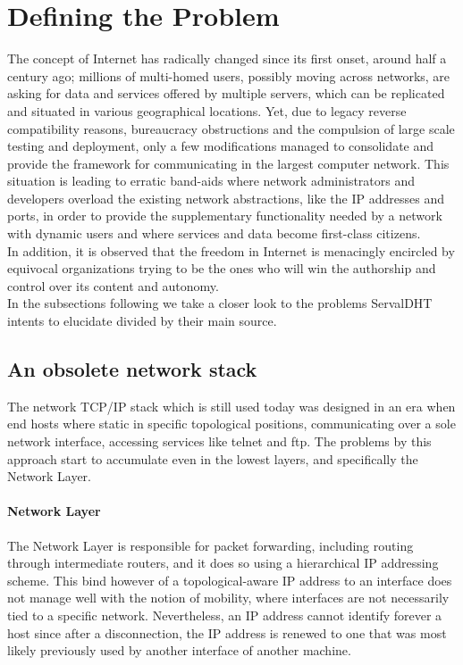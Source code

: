 \documentclass[12pt,a4paper,oneside]{article}
\begin{document}
\section{Defining the Problem}
The concept of Internet has radically changed since its first onset, around half a century ago; millions of multi-homed users, possibly moving across networks, are asking for data and services offered by multiple servers, which can be replicated and situated in various geographical locations.
Yet, due to legacy reverse compatibility reasons, bureaucracy obstructions and the compulsion of large scale testing and deployment, only a few modifications managed to consolidate and provide the framework for communicating in the largest computer network.
This situation is leading to erratic band-aids where network administrators and developers overload the existing network abstractions, like the IP  addresses and ports, in order to provide the supplementary functionality needed by a network with dynamic users and where services and data become first-class citizens.\\
\indent In addition, it is observed that the freedom in Internet is menacingly encircled by equivocal organizations trying to be the ones who will win the authorship and control over its content and autonomy.\\
\indent In the subsections following we take a closer look to the problems ServalDHT intents to elucidate divided by their main source.

\subsection{An obsolete network stack}
The network TCP/IP  stack which is still used today was designed in an era when end hosts where static in specific topological positions, communicating over a sole network interface, accessing services like telnet and ftp.
The problems by this approach start to accumulate even in the lowest layers, and specifically the Network Layer.
\paragraph{Network Layer} The Network Layer is responsible for packet forwarding, including routing through intermediate routers, and it does so using a hierarchical IP addressing scheme.
This bind however of a topological-aware IP address to an interface does not manage well with the notion of mobility, where interfaces are not necessarily tied to a specific network.
Nevertheless, an IP address cannot identify forever a host since after a disconnection, the IP address is renewed to one that was most likely previously used by another interface of another machine.
\pagebreak
\end{document}

